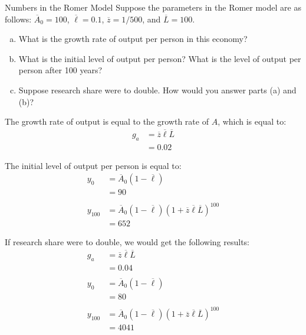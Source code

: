 \documentclass[10pt]{extarticle}
\begin{document}
  \begin{problem}{Numbers in the Romer Model}
    Suppose the parameters in the Romer model are as follows: $\overline{A}_0 = 100$, $\overline{\ell} = 0.1$, $\overline{z} = 1/500$, and $\overline{L} = 100$.
    \begin{enumerate}[(a)]
      \item What is the growth rate of output per person in this economy?
      \item What is the initial level of output per person? What is the level of output per person after 100 years?
      \item Suppose research share were to double. How would you answer parts (a) and (b)?
    \end{enumerate}
  \end{problem}
  \begin{solution}
    \begin{tcolorbox}[colback = white, title = (a), breakable]
      The growth rate of output is equal to the growth rate of $A$, which is equal to:
      \begin{align*}
        g_a &= \overline{z}\overline{\ell}\overline{L} \\
            &= \boxed{0.02}
      \end{align*}
    \end{tcolorbox}
    \begin{tcolorbox}[colback = white, title = (b), breakable]
      The initial level of output per person is equal to:
      \begin{align*}
        y_0 &= \overline{A}_0 (1-\overline{\ell})\\
            &= \boxed{90}\\ 
            \\
        y_{100} &= \overline{A}_0 (1-\overline{\ell})(1 + \overline{z}\overline{\ell}\overline{L})^{100}\\
                &= \boxed{652}
      \end{align*}
    \end{tcolorbox}
    \begin{tcolorbox}[colback = white, title = (c), breakable]
      If research share were to double, we would get the following results:
      \begin{align*}
        g_a &= \overline{z}\overline{\ell}\overline{L}\\
            &= 0.04 \\
            \\
        y_0 &= \overline{A}_0 (1-\overline{\ell}) \\
            &= 80 \\
            \\
        y_{100} &= \overline{A}_0 (1-\overline{\ell})(1 + \overline{z}\overline{\ell}{\overline{L}})^{100} \\
                &= 4041
      \end{align*}
    \end{tcolorbox}
  \end{solution}
\end{document}
